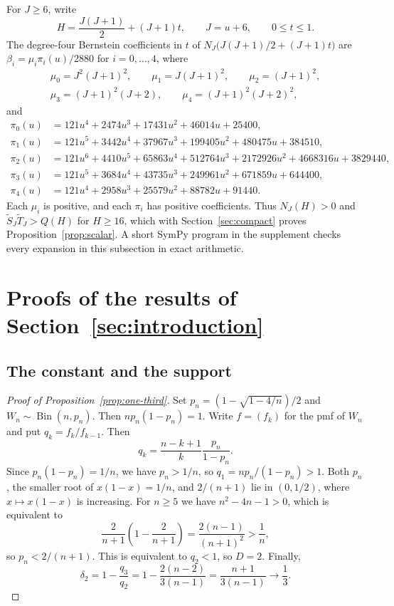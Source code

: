 \documentclass[ECP]{ejpecp}
\begin{document}
For $J\geq6$, write
\[
  H=\frac{J(J+1)}2+(J+1)t,
  \qquad J=u+6,
  \qquad 0\leq t\leq1.
\]
The degree-four Bernstein coefficients in $t$ of
$N_J\bigl(J(J+1)/2+(J+1)t\bigr)$ are $\beta_i=\mu_i\pi_i(u)/2880$ for
$i=0,\ldots,4$, where
\[
  \begin{gathered}
    \mu_0=J^2(J+1)^2,\qquad \mu_1=J(J+1)^2,\qquad \mu_2=(J+1)^2,\\
    \mu_3=(J+1)^2(J+2),\qquad \mu_4=(J+1)^2(J+2)^2,
  \end{gathered}
\]
and
\begin{align*}
  \pi_0(u)&=121u^4+2474u^3+17431u^2+46014u+25400,\\
  \pi_1(u)&=121u^5+3442u^4+37967u^3+199405u^2+480475u+384510,\\
  \pi_2(u)&=121u^6+4410u^5+65863u^4+512764u^3
    +2172926u^2+4668316u+3829440,\\
  \pi_3(u)&=121u^5+3684u^4+43735u^3+249961u^2+671859u+644400,\\
  \pi_4(u)&=121u^4+2958u^3+25579u^2+88782u+91440.
\end{align*}
Each $\mu_i$ is positive, and each $\pi_i$ has positive coefficients. Thus
$N_J(H)>0$ and $\tilde S_J\tilde T_J>Q(H)$ for $H\geq16$, which with
Section~\ref{sec:compact} proves Proposition~\ref{prop:scalar}. A short
SymPy program in the supplement checks every expansion in this subsection in
exact arithmetic.

\section{Proofs of the results of Section~\ref{sec:introduction}}
\label{sec:proofs}

\subsection{The constant and the support}

\begin{proof}[Proof of Proposition~\ref{prop:one-third}]
  Set $p_n=(1-\sqrt{1-4/n})/2$ and $W_n\sim\operatorname{Bin}(n,p_n)$.
  Then $np_n(1-p_n)=1$. Write $f=(f_k)$ for the pmf of $W_n$ and put
  $q_k=f_k/f_{k-1}$. Then
  \[
    q_k=\frac{n-k+1}{k}\frac{p_n}{1-p_n}.
  \]
  Since $p_n(1-p_n)=1/n$, we have $p_n>1/n$, so $q_1=np_n/(1-p_n)>1$.
  Both $p_n$, the smaller root of $x(1-x)=1/n$, and $2/(n+1)$ lie in
  $(0,1/2)$, where $x\mapsto x(1-x)$ is increasing. For $n\geq5$ we have
  $n^2-4n-1>0$, which is equivalent to
  \[
    \frac{2}{n+1}\left(1-\frac{2}{n+1}\right)
    =\frac{2(n-1)}{(n+1)^2}>\frac1n,
  \]
  so $p_n<2/(n+1)$. This is equivalent to $q_2<1$, so $D=2$. Finally,
  \[
    \delta_2=1-\frac{q_3}{q_2}
    =1-\frac{2(n-2)}{3(n-1)}
    =\frac{n+1}{3(n-1)}\longrightarrow\frac13.
  \]
\end{proof}
\end{document}
